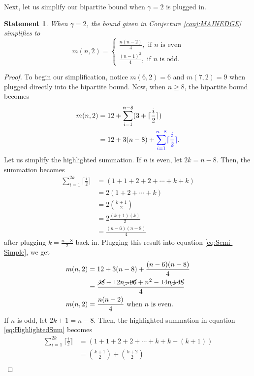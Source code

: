\documentclass[12pt]{amsart}
\newcommand{\bc}[1]{\textcolor{blue}{#1}}
\newcommand{\ceil}[1]{\lceil{#1}\rceil}
\newtheorem{state}[thm]{Statement}
\begin{document}
Next, let us simplify our bipartite bound when $\gamma = 2$ is plugged in.
\begin{state}\label{state:g2simplified}
    When $\gamma = 2$, the bound given in Conjecture \ref{conj:MAINEDGE} simplifies to
    $$m(n,2) = \begin{cases}
        \frac{n(n-2)}{4}, \text{     if $n$ is even}\\
        \frac{(n-1)^2}{4},\text{     if $n$ is odd.}
    \end{cases}$$
\end{state}
\begin{proof}
    To begin our simplification, notice $m(6,2) = 6$ and $m(7,2) = 9$ when plugged directly into the bipartite bound. Now, when $n \geq 8$, the bipartite bound becomes 
    \begin{align}\label{eq:Semi-Simple}
        m(n,2) &= 12 + \sum_{i=1}^{n-8} (3 + \ceil{\frac{i}{2}})\\
        &= 12 + 3(n-8) + \bc{\sum_{i=1}^{n-8} \ceil{\frac{i}{2}}}.
        \label{eq:HighlightedSum}
    \end{align}
Let us simplify the highlighted summation. If $n$ is even, let $2k = n-8$. Then, the summation becomes
\begin{align*}
    \sum_{i=1}^{2k}\ceil{\frac{i}{2}} &= (1 + 1 + 2 + 2 + \cdots + k + k)\\
    &= 2(1 + 2 + \cdots + k)\\
    &= 2 {k+1\choose 2}\\
    &= 2 \frac{(k+1)(k)}{2}\\
    &= \frac{(n-6)(n-8)}{4}
\end{align*}
after plugging $k = \frac{n-8}{2}$ back in. Plugging this result into equation \ref{eq:Semi-Simple}, we get
\begin{align*}
    m(n,2) &= 12 + 3(n-8) + \frac{(n-6)(n-8)}{4}\\
    &= \frac{\cancel{48} + 12n \cancel{- 96} + n^2 - 14n \cancel{+ 48}}{4}\\
   m(n,2) &= \frac{n(n-2)}{4} \text{  when } n \text{ is even.}
\end{align*}
If $n$ is odd, let $2k + 1 = n - 8$. Then, the highlighted summation in equation \ref{eq:HighlightedSum} becomes
\begin{align*}
     \sum_{i=1}^{2k}\ceil{\frac{i}{2}} &= (1 + 1 + 2 + 2 + \cdots + k + k + (k+1))\\
     &= {k + 1\choose 2} + {k+2\choose 2}\\

\end{align*}
\end{proof}
\end{document}
